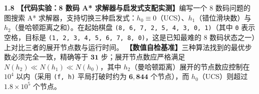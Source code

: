 \textbf{1.8} \quad \textbf{【代码实验：8 数码 A* 求解器与启发式支配实测】}编写一个 8 数码问题的图搜索 A* 求解器，支持切换三种启发式：$h_0 \equiv 0$（UCS）、$h_1$（错位滑块数）与 $h_2$（曼哈顿距离之和）。在起始棋盘 \texttt{(8, 6, 7, 2, 5, 4, 3, 0, 1)}（其中 \texttt{0} 表示空格，目标是 \texttt{(1, 2, 3, 4, 5, 6, 7, 8, 0)}，这是已知最难的 8 数码状态之一）上对比三者的展开节点数与运行时间。
\textbf{【数值自检基准】}三种算法找到的最优步数必须完全一致，精确等于 $\mathbf{31}$ 步；展开节点数应严格满足 $N(h_2) \ll N(h_1) \ll N(h_0)$，其中 $h_2$（曼哈顿距离）展开的节点数应控制在 $10^4$ 以内（采用 \texttt{(f, h)} 平局打破时约为 $\mathbf{6{,}844}$ 个节点），而 $h_0$（UCS）则超过 $1.8\times 10^5$ 个节点。
